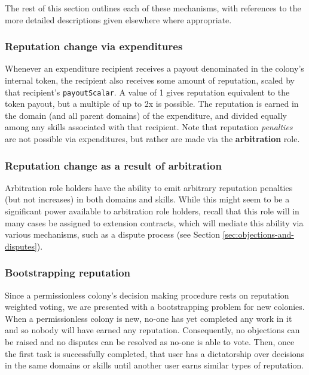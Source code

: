 The rest of this section outlines each of these mechanisms, with references to the more detailed descriptions given elsewhere where appropriate.

\subsubsection*{Reputation change via expenditures}

Whenever an expenditure recipient receives a payout denominated in the colony's internal token, the recipient also receives some amount of reputation, scaled by that recipient's \texttt{payoutScalar}. A value of 1 gives reputation equivalent to the token payout, but a multiple of up to 2x is possible. The reputation is earned in the domain (and all parent domains) of the expenditure, and divided equally among any skills associated with that recipient. Note that reputation \textit{penalties} are not possible via expenditures, but rather are made via the \textbf{arbitration} role.

\subsubsection*{Reputation change as a result of arbitration}\label{sec:earning-rep-in-disputes}

Arbitration role holders have the ability to emit arbitrary reputation penalties (but not increases) in both domains and skills. While this might seem to be a significant power available to arbitration role holders, recall that this role will in many cases be assigned to extension contracts, which will mediate this ability via various mechanisms, such as a dispute process (see Section \ref{sec:objections-and-disputes}).

\subsubsection*{Bootstrapping reputation}\label{sec:bootstrapping-rep}

Since a permissionless colony's decision making procedure rests on reputation weighted voting, we are presented with a bootstrapping problem for new colonies. When a permissionless colony is new, no-one has yet completed any work in it and so nobody will have earned any reputation. Consequently, no objections can be raised and no disputes can be resolved as no-one is able to vote. Then, once the first task is successfully completed, that user has a dictatorship over decisions in the same domains or skills until another user earns similar types of reputation.


